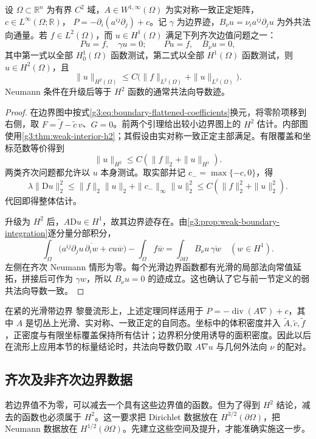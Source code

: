 \begin{theorem}\label{g3:thm:boundary-h2-homogeneous}
	设 \(\Omega\subset\mathbb R^n\) 为有界 \(C^2\) 域，\(A\in W^{1,\infty}(\Omega)\) 为实对称一致正定矩阵，\(c\in L^\infty(\Omega;\mathbb R)\)，
	\(P=-\partial_i(a^{ij}\partial_j)+c\)。记 \(\gamma\) 为边界迹，\(B_\nu u=\nu_i a^{ij}\partial_ju\) 为外共法向通量。若 \(f\in L^2(\Omega)\)，而 \(u\in H^1(\Omega)\) 满足下列齐次边值问题之一：
	\[
	Pu=f,\quad\gamma u=0;\qquad
	Pu=f,\quad B_\nu u=0,
	\]
	其中第一式以全部 \(H_0^1(\Omega)\) 函数测试，第二式以全部 \(H^1(\Omega)\) 函数测试，则
	\(u\in H^2(\Omega)\)，且
	\begin{equation}\label{g3:eq:homogeneous-boundary-h2-estimate}
	\|u\|_{H^2(\Omega)}
	\le C\bigl(\|f\|_{L^2(\Omega)}+\|u\|_{L^2(\Omega)}\bigr).
	\end{equation}
	Neumann 条件在升级后等于 \(H^2\) 函数的通常共法向导数迹。
\end{theorem}
\begin{proof}
	在边界图中按式\eqref{g3:eq:boundary-flattened-coefficients}换元，将零阶项移到右侧，取
	\(F=\widetilde f-\widetilde c\,v\)、\(G=0\)。前两个引理给出较小边界图上的 \(H^2\) 估计。内部图使用\cref{g3:thm:weak-interior-h2}；其假设由实对称一致正定主部满足。有限覆盖和坐标范数等价得到
	\[
	\|u\|_{H^2}\le C(\|f\|_2+\|u\|_{H^1}).
	\]
	两类齐次问题都允许以 \(u\) 本身测试。取实部并记 \(c_-=\max\{-c,0\}\)，得
	\[
	\lambda\|\mathrm Du\|_2^2
	\le \|f\|_2\|u\|_2+\|c_-\|_\infty\|u\|_2^2
	\le C(\|f\|_2^2+\|u\|_2^2).
	\]
	代回即得整体估计。

	升级为 \(H^2\) 后，\(A\mathrm Du\in H^1\)，故其边界迹存在。由\cref{g3:prop:weak-boundary-integration}逐分量分部积分，
	\[
	\int_\Omega\bigl(a^{ij}\partial_ju\,\overline{\partial_iw}
																									+cu\overline w\bigr)
	-\int_\Omega f\overline w
	=\int_{\partial\Omega}B_\nu u\,\overline{\gamma w}
	\quad(w\in H^1).
	\]
	左侧在齐次 Neumann 情形为零。每个光滑边界函数都有光滑的局部法向常值延拓，拼接后可作为 \(\gamma w\)，所以 \(B_\nu u=0\) 的迹成立。这也确认了它与前一节定义的弱共法向导数一致。
\end{proof}

在紧的光滑带边界 黎曼流形上，上述定理同样适用于
\(P=-\operatorname{div}(A\nabla)+c\)，其中 \(A\) 是切丛上光滑、实对称、一致正定的自同态。坐标中的体积密度并入 \(\widetilde A,\widetilde c,\widetilde f\)，正密度与有限坐标覆盖保持所有估计；边界积分使用诱导的面积密度。因此以后在流形上应用本节的标量结论时，共法向导数仍取 \(A\nabla u\) 与几何外法向 \(\nu\) 的配对。

\subsection{齐次及非齐次边界数据}
\label{g3:subsec:1402:03}
若边界值不为零，可以减去一个具有这些边界值的函数。但为了得到 \(H^2\) 结论，减去的函数也必须属于 \(H^2\)。这一要求把 Dirichlet 数据放在 \(H^{3/2}(\partial\Omega)\)，把 Neumann 数据放在 \(H^{1/2}(\partial\Omega)\)。先建立这些空间及提升，才能准确实施这一步。

